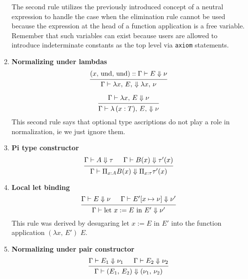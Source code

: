 \documentclass{article}
\begin{document}
\begin{enumerate}
  The second rule utilizes the previously introduced concept of a neutral
  expression to handle the case when the elimination rule cannot be used because
  the expression at the head of a function application is a free variable.
  Remember that such variables can exist because users are allowed to introduce
  indeterminate constants as the top level via \verb|axiom| statements.

  \item \textbf{Normalizing under lambdas} \\
  \[
    \begin{prooftree}
      \hypo{(x, \, \text{und}, \, \text{und}) :: \Gamma \vdash E \Downarrow \nu}
      \infer1{\Gamma \vdash \lambda x, \, E, \, \Downarrow \lambda x, \, \nu}
    \end{prooftree}
  \]

  \[
    \begin{prooftree}
      \hypo{\Gamma \vdash \lambda x, \, E \Downarrow \nu}
      \infer1{\Gamma \vdash \lambda \, (x : T), \, E, \, \Downarrow \nu}
    \end{prooftree}
  \]
  This second rule says that optional type ascriptions do not play a role in
  normalization, ie we just ignore them.

\item \textbf{Pi type constructor} \\
  \[
    \begin{prooftree}
      \hypo{\Gamma \vdash A \Downarrow \tau}
      \hypo{\Gamma \vdash B(x) \Downarrow \tau'(x)}
      \infer2{\Gamma \vdash \Pi_{x : A} B(x) \Downarrow \Pi_{x : \tau} \tau'(x)}
    \end{prooftree}
  \]

\item \textbf{Local let binding} \\
    \[
      \begin{prooftree}
        \hypo{\Gamma \vdash E \Downarrow \nu}
        \hypo{\Gamma \vdash E'[x \mapsto \nu] \Downarrow \nu'}
        \infer2{\Gamma \vdash \text{let } x := E \text{ in } E' \Downarrow \nu'}
      \end{prooftree}
    \]
    This rule was derived by desugaring $\text{let } x := E \text{ in } E'$ into
    the function application $(\lambda x, \, E') \,\, E$.

\item \textbf{Normalizing under pair constructor} \\
    \[
      \begin{prooftree}
        \hypo{\Gamma \vdash E_1 \Downarrow \nu_1}
        \hypo{\Gamma \vdash E_2 \Downarrow \nu_2}
        \infer2{\Gamma \vdash (E_1, \, E_2) \Downarrow (\nu_1, \, \nu_2)}
      \end{prooftree}
    \]


\end{enumerate}
\end{document}
